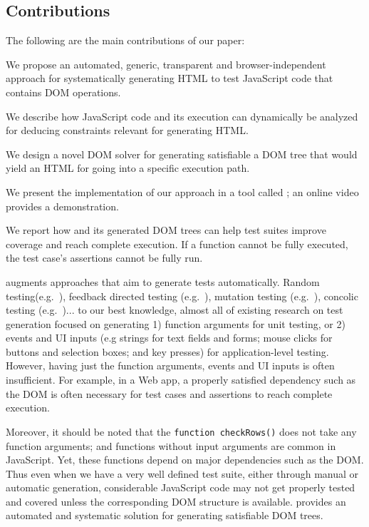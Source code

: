 \subsection{Contributions}
The following are the main contributions of our paper:
\begin {compactitem}
\item We propose an automated, generic, transparent and browser-independent approach for systematically generating HTML to test JavaScript code that contains DOM operations.
\item We describe how JavaScript code and its execution can dynamically be analyzed for deducing constraints relevant for generating HTML.
\item We design a novel DOM solver for generating satisfiable a DOM tree that would yield an HTML for going into a specific execution path. 
\item We present the implementation of our approach in a tool called \tool; an online video provides a demonstration.
\item We report how \tool and its generated DOM trees can help test suites improve coverage and reach complete execution.  If a function cannot be fully executed, the test case's assertions cannot be fully run.  
\end {compactitem}

\tool augments approaches that aim to generate tests automatically.  
Random testing(e.g.~\cite{artemis}), feedback directed testing (e.g.~\cite{feedbackConcolic}), mutation testing (e.g.~\cite{pythia}), concolic testing (e.g.~\cite{cute, jalangi, kudzu, eventConcolic})... 
to our best knowledge, almost all of existing research on test generation focused on generating 1) function arguments for unit testing, or 2) events and UI inputs (e.g strings for text fields and forms; mouse clicks for buttons and selection boxes; and key presses) for application-level testing.
However, having just the function arguments, events and UI inputs is often insufficient.  For example, in a Web app, a properly satisfied dependency such as the DOM is often necessary for test cases and assertions to reach complete execution.  

Moreover, it should be noted that the {\tt function checkRows()} does not take any function arguments; and functions without input arguments are common in JavaScript.
Yet, these functions depend on major dependencies such as the DOM.
Thus even when we have a very well defined test suite, either through manual or automatic generation, considerable JavaScript code may not get properly tested and covered unless the corresponding DOM structure is available.  
\tool provides an automated and systematic solution for generating satisfiable DOM trees.  

